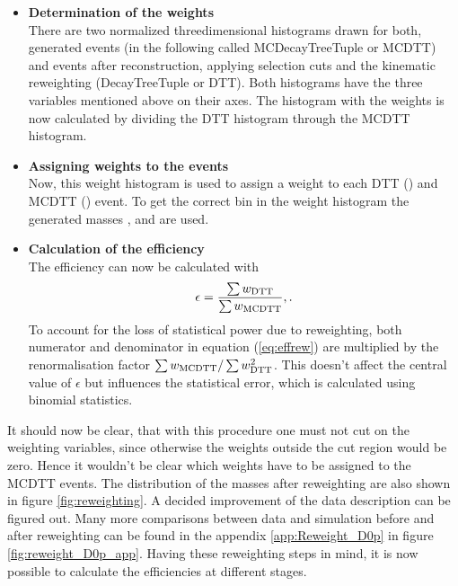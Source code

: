 \begin{itemize}
    \item \textbf{Determination of the weights} \\
          There are two normalized threedimensional histograms drawn for both, generated events (in the following called MCDecayTreeTuple or MCDTT) and events after reconstruction, applying selection cuts and the kinematic reweighting (DecayTreeTuple or DTT). 
          Both histograms have the three variables mentioned above on their axes.
          The histogram with the weights is now calculated by dividing the DTT histogram through the MCDTT histogram.
    \item \textbf{Assigning weights to the events} \\
          Now, this weight histogram is used to assign a weight to each DTT () and MCDTT () event.
          To get the correct bin in the weight histogram the generated masses \Mtrue{\Dz\proton}, \Mtrue{\Dz\mun} and \Mtrue{\Dz\proton\mun} are used.
    \item \textbf{Calculation of the efficiency} \\
          The efficiency can now be calculated with
          \begin{align}
              \epsilon = \frac{\sum w_{\text{DTT}}}{\sum w_{\text{MCDTT}}}, \label{eq:effrew}.
          \end{align}
          To account for the loss of statistical power due to reweighting, both numerator and denominator in equation (\ref{eq:effrew}) are multiplied by the renormalisation factor $\sum w_{\text{MCDTT}} / \sum w_{\text{DTT}}^2$. 
          This doesn't affect the central value of $\epsilon$ but influences the statistical error, which is calculated using binomial statistics.
\end{itemize}
It should now be clear, that with this procedure one must not cut on the weighting variables, since otherwise the weights outside the cut region would be zero. 
Hence it wouldn't be clear which weights have to be assigned to the MCDTT events. 
The distribution of the masses after reweighting are also shown in figure \ref{fig:reweighting}.
A decided improvement of the data description can be figured out.
Many more comparisons between data and simulation before and after reweighting can be found in the appendix \ref{app:Reweight_D0p} in figure \ref{fig:reweight_D0p_app}.
Having these reweighting steps in mind, it is now possible to calculate the efficiencies at different stages.



